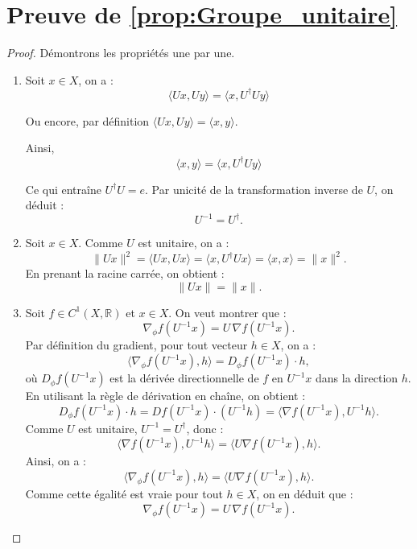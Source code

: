 \documentclass[a4paper,10pt]{article}
\theoremstyle{definition} %
\theoremstyle{definition} %
\theoremstyle{definition} %
\theoremstyle{definition} %
\newcommand{\R}{\mathbb{R}}
\begin{document}
\section{Preuve de \cref{prop:Groupe_unitaire}}\label{sec:proof_groupe_unitaire}
\begin{proof}
    Démontrons les propriétés une par une.

    \begin{enumerate}[label=(\roman*)]
        \item Soit $x \in X$, on a :
        \begin{equation*}
            \langle Ux, U y \rangle = \langle x, U^\dagger U y \rangle
        \end{equation*}
        
        Ou encore, par définition $\langle Ux, U y \rangle= \langle x, y \rangle $.

        Ainsi,
        \begin{equation*}
            \langle x, y \rangle = \langle x, U^\dagger U y \rangle
        \end{equation*}

        Ce qui entraîne $U^\dagger U = e$. Par unicité de la transformation inverse de $U$, on déduit :
        \[
        U^{-1} = U^\dagger.
        \]
        \item Soit \( x \in X \). Comme \( U \) est unitaire, on a :
        \[
        \|Ux\|^2 = \langle Ux, Ux \rangle = \langle x, U^\dagger U x \rangle = \langle x, x \rangle = \|x\|^2.
        \]
        En prenant la racine carrée, on obtient :
        \[
        \|Ux\| = \|x\|.
        \]

        \item Soit \( f \in C^1(X, \R) \) et \( x \in X \). On veut montrer que :
        \[
        \nabla_\phi f(U^{-1}x) = U \, \nabla f(U^{-1}x).
        \]
        Par définition du gradient, pour tout vecteur \( h \in X \), on a :
        \[
        \langle \nabla_\phi f(U^{-1}x), h \rangle = D_\phi f(U^{-1}x) \cdot h,
        \]
        où \( D_\phi f(U^{-1}x) \) est la dérivée directionnelle de \( f \) en \( U^{-1}x \) dans la direction \( h \). En utilisant la règle de dérivation en chaîne, on obtient :
        \[
        D_\phi f(U^{-1}x) \cdot h = D f(U^{-1}x) \cdot (U^{-1} h) = \langle \nabla f(U^{-1}x), U^{-1} h \rangle.
        \]
        Comme \( U \) est unitaire, \( U^{-1} = U^\dagger \), donc :
        \[
        \langle \nabla f(U^{-1}x), U^{-1} h \rangle = \langle U \nabla f(U^{-1}x), h \rangle.
        \]
        Ainsi, on a :
        \[
        \langle \nabla_\phi f(U^{-1}x), h \rangle = \langle U \nabla f(U^{-1}x), h \rangle.
        \]
        Comme cette égalité est vraie pour tout \( h \in X \), on en déduit que :
        \[
        \nabla_\phi f(U^{-1}x) = U \, \nabla f(U^{-1}x).
        \]
    \end{enumerate}
\end{proof}
\end{document}
